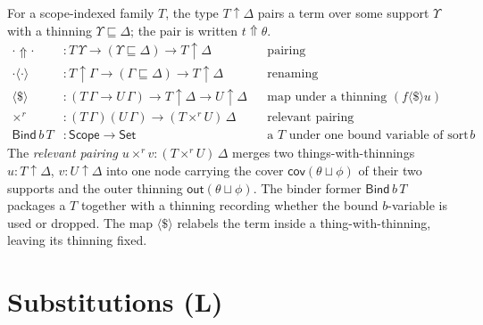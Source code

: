 \documentclass{article}
\newcommand{\Scope}{\mathsf{Scope}}
\newcommand{\thin}{\sqsubseteq}                    %
\newcommand{\cop}{\mathbin{\sqcup}}                 %
\newcommand{\out}{\mathsf{out}}
\newcommand{\cov}{\mathsf{cov}}
\newcommand{\Th}[2]{#1 {\uparrow} #2}              %
\newcommand{\wt}[2]{#1 {\Uparrow} #2}              %
\newcommand{\ren}[2]{#1\langle#2\rangle}           %
\newcommand{\fmap}{\mathbin{\langle\$\rangle}}     %
\newcommand{\catL}{\textbf{(L)}}
\theoremstyle{plain}
\begin{document}
For a scope-indexed family $T$, the type $\Th{T}{\Delta}$ pairs a term over some
support $\Upsilon$ with a thinning $\Upsilon\thin\Delta$; the pair is written $\wt{t}{\theta}$.
\begin{align*}
  \wt{\cdot}{\cdot}&: T\,\Upsilon \to (\Upsilon\thin\Delta) \to \Th{T}{\Delta}
    && \text{pairing}\\
  \ren{\cdot}{\cdot}&: \Th{T}{\Gamma} \to (\Gamma\thin\Delta) \to \Th{T}{\Delta}
    && \text{renaming}\\
  \fmap &: (T\,\Gamma \to U\,\Gamma) \to \Th{T}{\Delta} \to \Th{U}{\Delta}
    && \text{map under a thinning } (f\fmap u)\\
  \times^{r} &: (T\,\Gamma)(U\,\Gamma) \to (T\times^{r}U)\,\Delta
    && \text{relevant pairing}\\
  \mathsf{Bind}\,b\,T &: \Scope \to \mathsf{Set}
    && \text{a } T \text{ under one bound variable of sort } b
\end{align*}
The \emph{relevant pairing} $u \times^{r} v : (T\times^{r}U)\,\Delta$ merges two
things-with-thinnings $u : \Th{T}{\Delta}$, $v : \Th{U}{\Delta}$ into one node carrying
the cover $\cov(\theta\cop\phi)$ of their two supports and the outer thinning
$\out(\theta\cop\phi)$.
The binder former $\mathsf{Bind}\,b\,T$ packages a $T$ together with a thinning recording
whether the bound $b$-variable is \textsf{use}d or \textsf{drop}ped.
The map $\fmap$ relabels the term inside a thing-with-thinning, leaving its thinning fixed.

\section{Substitutions \hfill \catL}\label{sig:sub}
\end{document}

